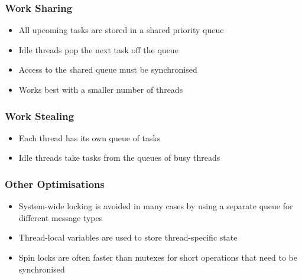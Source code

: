 \documentclass{beamer}
\begin{document}
	\begin{frame}
		\frametitle{Work Sharing}
		
		\begin{itemize}
			\item All upcoming tasks are stored in a shared priority queue
			\item Idle threads pop the next task off the queue
			\item Access to the shared queue must be synchronised
			\item Works best with a smaller number of threads
		\end{itemize}
	\end{frame}
	
	\begin{frame}
		\frametitle{Work Stealing}
		
		\begin{itemize}
			\item Each thread has its own queue of tasks
			\item Idle threads take tasks from the queues of busy threads
		\end{itemize}
	\end{frame}
	
	\begin{frame}
		\frametitle{Other Optimisations}
		
		\begin{itemize}
			\item System-wide locking is avoided in many cases by using a separate queue for different message types
			\item Thread-local variables are used to store thread-specific state
			\item Spin locks are often faster than mutexes for short operations that need to be synchronised
		\end{itemize}
	\end{frame}
	
\end{document}
